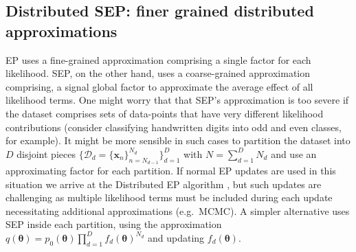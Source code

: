\subsection{Distributed SEP: finer grained distributed approximations}

EP uses a fine-grained approximation comprising a single factor for each likelihood. SEP, on the other hand, uses a coarse-grained approximation comprising, a signal global factor to approximate the average effect of all likelihood terms. One might worry that that SEP's approximation is too severe if the dataset comprises sets of data-points that have very different likelihood contributions (consider classifying handwritten digits into odd and even classes, for example). It might be more sensible in such cases to partition the dataset into $D$ disjoint pieces $\{ \mathcal{D}_d = \{\bm{x}_n\}_{n=N_{d-1}}^{N_d} \}_{d=1}^{D}$ with $N = \sum_{d=1}^D N_d$ and use an approximating factor for each partition. If normal EP updates are used in this situation we arrive at the Distributed EP algorithm \cite{gelman:dep}\cite{xu:sms}, but such updates are challenging as multiple likelihood terms must be included during each update necessitating additional approximations (e.g.~MCMC). A simpler alternative uses SEP inside each partition, using the approximation $q(\bm{\theta}) = p_0(\bm{\theta}) \prod_{d=1}^D f_{d}(\bm{\theta})^{N_d}$ and updating $f_{d}(\bm{\theta})$.


%
%


